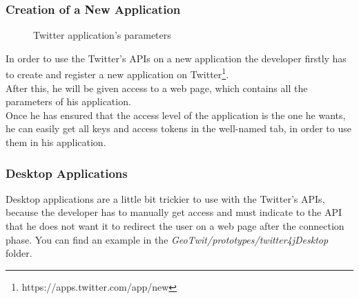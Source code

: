 \documentclass[a4paper,11pt]{report}
\begin{document}
\subsubsection{Creation of a New Application}
\label{creatingNewTwitterApplication}
\begin{figure}
\vspace{-50pt}
\begin{center}
\caption{Twitter application's parameters}
\end{center}
\vspace{-32pt}
\end{figure}

\vspace{30pt}
In order to use the Twitter's APIs on a new application the developer firstly has to create and register a new application on Twitter\footnote{https://apps.twitter.com/app/new}.\\

After this, he will be given access to a web page, which contains all the parameters of his application.\\

Once he has ensured that the access level of the application is the one he wants, he can easily get all keys and access tokens in the well-named tab, in order to use them in his application.
\newpage

\subsubsection{Desktop Applications}
Desktop applications are a little bit trickier to use with the Twitter's APIs, because the developer has to manually get access and must indicate to the API that he does not want it to redirect the user on a web page after the connection phase. You can find an example in the \emph{GeoTwit/prototypes/twitter4jDesktop} folder.\\
\end{document}
